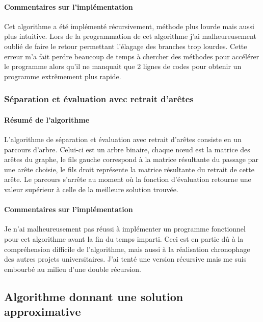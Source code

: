 \documentclass[10pt,a4paper]{report}
\begin{document}
		\paragraph{Commentaires sur l'implémentation\\}
		Cet algorithme a été implémenté récursivement, méthode plus lourde mais aussi plus intuitive.
		Lors de la programmation de cet algorithme j'ai malheureusement oublié de faire le retour permettant l'élagage des branches trop lourdes. Cette erreur m'a fait perdre beaucoup de temps à chercher des méthodes pour accélérer le programme alors qu'il ne manquait que 2 lignes de codes pour obtenir un programme extrêmement plus rapide.
		
		
		\subsubsection{Séparation et évaluation avec retrait d'arêtes}		
		
		\paragraph{Résumé de l'algorithme\\}
		L'algorithme de séparation et évaluation avec retrait d'arêtes consiste en un parcours d'arbre. Celui-ci est un arbre binaire, chaque nœud est la matrice des arêtes du graphe, le fils gauche correspond à la matrice résultante du passage par une arête choisie, le fils droit représente la matrice résultante du retrait de cette arête. Le parcours s'arrête au moment où la fonction d'évaluation retourne une valeur supérieur à celle de la meilleure solution trouvée.\\
		
		\paragraph{Commentaires sur l'implémentation\\}
		Je n'ai malheureusement pas réussi à implémenter un programme fonctionnel pour cet algorithme avant la fin du temps imparti. Ceci est en partie dû à la compréhension difficile de l'algorithme, mais aussi à la réalisation chronophage des autres projets universitaires.
		J'ai tenté une version récursive mais me suis embourbé au milieu d'une double récursion.
		
		
	\subsection{Algorithme donnant une solution approximative}
	
\end{document}
